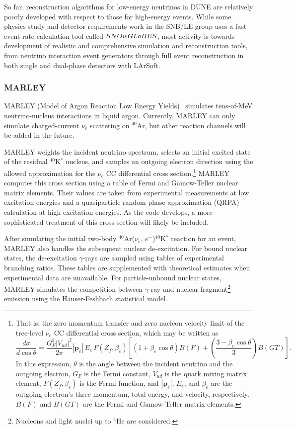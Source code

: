 So far, reconstruction algorithms for low-energy neutrinos in DUNE are
relatively poorly developed with respect to those for high-energy events.  While
some physics study and detector requirements work in the SNB/LE group
uses a fast event-rate calculation tool called $SNOwGLoBES$, most
activity is towards development of realistic and comprehensive
simulation and reconstruction tools, from neutrino interaction event
generators through full event reconstruction in both single and
dual-phase detectors with LArSoft.


\subsubsection{MARLEY}

MARLEY (Model of Argon Reaction Low Energy Yields)~\cite{marley} simulates tens-of-MeV
neutrino-nucleus interactions in liquid argon. Currently, MARLEY can only
simulate charged-current $\nu_e$ scattering on $^{40}$Ar, but other
reaction channels will be added in the future.

MARLEY weights the incident neutrino spectrum, selects an initial excited state
of the residual $^{40}$K$^*$ nucleus, and samples an outgoing electron
direction using the allowed approximation for the $\nu_e$ CC differential cross
section.\footnote{That is, the zero momentum transfer and zero nucleon velocity
limit of the tree-level $\nu_e$ CC differential cross section, which may be
written as
\[
\frac{d\sigma}{d\cos \theta}
= \frac{G_F^2 |V_{ud}|^2}{2\pi} |\mathbf{p}_e|\, E_e \,F(Z_f, \beta_e)
\left[(1+\beta_e \cos\theta)B(F) + \left(\frac{3 - \beta_e \cos\theta}
{3}\right)B(GT)\right].
\]
In this expression, $\theta$ is the angle between the incident neutrino and the
outgoing electron, $G_F$ is the Fermi constant, $V_{ud}$ is the quark mixing
matrix element, $F(Z_f, \beta_e)$ is the Fermi function, and $|\mathbf{p}_e|$,
$E_e$, and $\beta_e$ are the outgoing electron's three momentum, total energy,
and velocity, respectively. $B(F)$ and $B(GT)$ are the Fermi and Gamow-Teller
matrix elements.
}
MARLEY computes this cross section using a table of Fermi and Gamow-Teller
nuclear matrix elements. Their values are taken from experimental measurements
at low excitation energies and a quasiparticle random phase approximation
(QRPA) calculation at high excitation energies. As the code develops, a more
sophisticated treatment of this cross section will likely be included.

After simulating the initial two-body $^{40}${Ar}($\nu_e$,
$e^{-}$)$^{40}$K$^*$ reaction for an event, MARLEY
also handles the subsequent nuclear de-excitation. For bound nuclear
states, the de-excitation $\gamma$-rays are sampled using tables of
experimental branching ratios. These tables are supplemented with
theoretical estimates when experimental data are unavailable. For
particle-unbound nuclear states, MARLEY simulates the competition between
$\gamma$-ray and nuclear fragment\footnote{ Nucleons and light nuclei up to
$^{4}${He} are considered.} emission using the Hauser-Feshbach
statistical model.

